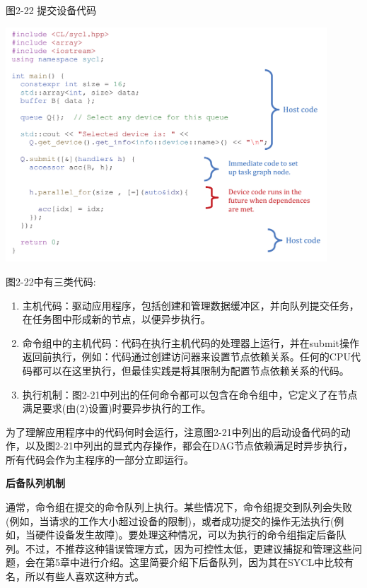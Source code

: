 \hspace*{\fill} \par %
图2-22 提交设备代码
\begin{center}
	\includegraphics[width=0.9\textwidth]{content/chapter-2/images/12}
\end{center}

图2-22中有三类代码:\par

\begin{enumerate}
	\item 主机代码：驱动应用程序，包括创建和管理数据缓冲区，并向队列提交任务，在任务图中形成新的节点，以便异步执行。
	\item 命令组中的主机代码：代码在执行主机代码的处理器上运行，并在submit操作返回前执行，例如：代码通过创建访问器来设置节点依赖关系。任何的CPU代码都可以在这里执行，但最佳实践是将其限制为配置节点依赖关系的代码。
	\item 执行机制：图2-21中列出的任何命令都可以包含在命令组中，它定义了在节点满足要求(由(2)设置)时要异步执行的工作。
\end{enumerate}

为了理解应用程序中的代码何时会运行，注意图2-21中列出的启动设备代码的动作，以及图2-21中列出的显式内存操作，都会在DAG节点依赖满足时异步执行，所有代码会作为主程序的一部分立即运行。\par

\hspace*{\fill} \par %
\textbf{后备队列机制}

通常，命令组在提交的命令队列上执行。某些情况下，命令组提交到队列会失败(例如，当请求的工作大小超过设备的限制)，或者成功提交的操作无法执行(例如，当硬件设备发生故障)。要处理这种情况，可以为执行的命令组指定后备队列。不过，不推荐这种错误管理方式，因为可控性太低，更建议捕捉和管理这些问题，会在第5章中进行介绍。这里简要介绍下后备队列，因为其在SYCL中比较有名，所以有些人喜欢这种方式。\par

